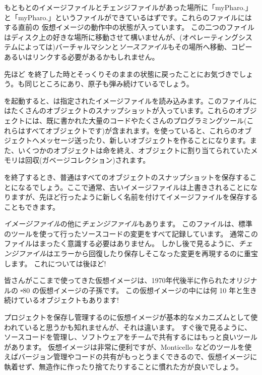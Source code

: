 \documentclass[a4paper,10pt,twoside]{book}
\begin{document}
もともとのイメージファイルとチェンジファイルがあった場所に「myPharo.」と「myPharo.」というファイルができているはずです。これらのファイルには  する直前の \pharo 仮想イメージの動作中の状態が入っています。
この二つのファイルはディスク上の好きな場所に移動させて構いませんが、(オペレーティングシステムによっては)バーチャルマシンと\emph{ソースファイル}もその場所へ移動、コピーあるいはリンクする必要があるかもしれません。


先ほど \pharo を終了した時とそっくりそのままの状態に戻ったことにお気づきでしょう。\bam も同じところにあり、原子も弾み続けているでしょう。

\pharo を起動すると、\pharo {}は指定されたイメージファイルを読み込みます。このファイルにはたくさんのオブジェクトのスナップショットが入っています。これらのオブジェクトには、既に書かれた大量のコードやたくさんのプログラミングツール(これらはすべてオブジェクトです)が含まれます。\pharo を使っていると、これらのオブジェクトへメッセージ送ったり、新しいオブジェクトを作ることになります。また、いくつかのオブジェクトは命を終え、オブジェクトに割り当てられていたメモリは回収(\ie ガベージコレクション)されます。

\pharo を終了するとき、普通はすべてのオブジェクトのスナップショットを保存することになるでしょう。ここで通常、古いイメージファイルは上書きされることになりますが、先ほど行ったように新しく名前を付けてイメージファイルを保存することもできます。

\emph{イメージファイル}の他に\emph{チェンジファイル}もあります。
このファイルは、標準のツールを使って行ったソースコードの変更をすべて記録しています。
通常このファイルはまったく意識する必要はありません。
しかし後で見るように、\emph{チェンジファイル}はエラーから回復したり保存しそこなった変更を再現するのに重宝します。
これについては後ほど!

皆さんがここまで使ってきた仮想イメージは、1970年代後半に作られたオリジナルの \st-80 の仮想イメージの子孫です。
この仮想イメージの中には何 10 年と生き続けているオブジェクトもあります!

プロジェクトを保存し管理するのに仮想イメージが基本的なメカニズムとして使われていると思うかも知れませんが、それは違います。
すぐ後で見るように、ソースコードを管理し、ソフトウェアをチームで共有するにはもっと良いツールがあります。
仮想イメージは非常に便利ですが、Monticello などのツールを使えばバージョン管理やコードの共有がもっとうまくできるので、仮想イメージに執着せず、無造作に作ったり捨てたりすることに慣れた方が良いでしょう。
\end{document}
